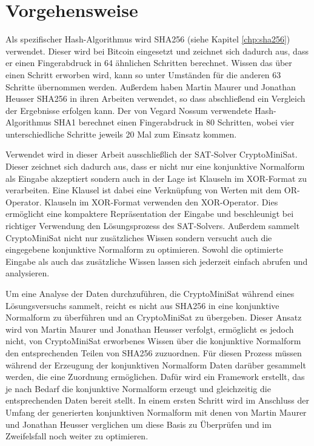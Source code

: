 \section{Vorgehensweise}

Als spezifischer Hash-Algorithmus wird SHA256 (siehe Kapitel \ref{chp:sha256}) verwendet. Dieser wird bei Bitcoin eingesetzt
und zeichnet sich dadurch aus, dass er einen Fingerabdruck in 64 ähnlichen Schritten berechnet. Wissen das über einen Schritt
erworben wird, kann so unter Umständen für die anderen 63 Schritte übernommen werden. Außerdem haben Martin Maurer und Jonathan
Heusser SHA256 in ihren Arbeiten verwendet, so dass abschließend ein Vergleich der Ergebnisse erfolgen kann. Der von Vegard Nossum
verwendete Hash-Algorithmus SHA1 berechnet einen Fingerabdruck in 80 Schritten, wobei vier unterschiedliche Schritte jeweils 20 Mal
zum Einsatz kommen.

Verwendet wird in dieser Arbeit ausschließlich der SAT-Solver CryptoMiniSat. Dieser zeichnet sich dadurch aus, dass er nicht nur
eine konjunktive Normalform als Eingabe akzeptiert sondern auch in der Lage ist Klauseln im XOR-Format zu verarbeiten. Eine Klausel
ist dabei eine Verknüpfung von Werten mit dem OR-Operator. Klauseln im XOR-Format verwenden den XOR-Operator. Dies ermöglicht
eine kompaktere Repräsentation der Eingabe und beschleunigt bei richtiger Verwendung den Lösungsprozess des SAT-Solvers.
Außerdem sammelt CryptoMiniSat nicht nur zusätzliches Wissen sondern versucht auch die eingegebene konjunktive Normalform zu
optimieren. Sowohl die optimierte Eingabe als auch das zusätzliche Wissen lassen sich jederzeit einfach abrufen und analysieren.

Um eine Analyse der Daten durchzuführen, die CryptoMiniSat während eines Lösungsversuchs sammelt, reicht es nicht aus SHA256
in eine konjunktive Normalform zu überführen und an CryptoMiniSat zu übergeben. Dieser Ansatz wird von Martin Maurer und Jonathan
Heusser verfolgt, ermöglicht es jedoch nicht, von CryptoMiniSat erworbenes Wissen über die konjunktive Normalform den
entsprechenden Teilen von SHA256 zuzuordnen. Für diesen Prozess müssen während der Erzeugung der konjunktiven Normalform
Daten darüber gesammelt werden, die eine Zuordnung ermöglichen. Dafür wird ein Framework erstellt, das je nach Bedarf
die konjunktive Normalform erzeugt und gleichzeitig die entsprechenden Daten bereit stellt. In einem ersten Schritt
wird im Anschluss der Umfang der generierten konjunktiven Normalform mit denen von Martin Maurer und Jonathan Heusser
verglichen um diese Basis zu Überprüfen und im Zweifelsfall noch weiter zu optimieren.

